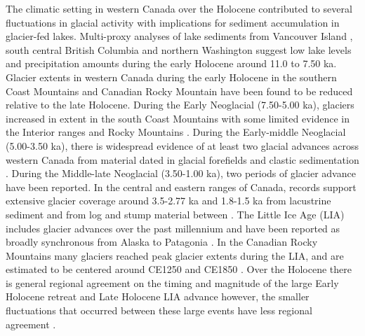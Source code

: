 \documentclass[Royal,times,doublespace,sageh]{sagej}
\begin{document}
The climatic setting in western Canada over the Holocene contributed to
several fluctuations in glacial activity with implications for sediment
accumulation in glacier-fed lakes. Multi-proxy analyses of lake
sediments from Vancouver Island \citep{Brown2006}, south central British
Columbia \citep{Lowe1997} and northern Washington \citep{Steinman2019}
suggest low lake levels and precipitation amounts during the early
Holocene around 11.0 to 7.50 ka. Glacier extents in western Canada
during the early Holocene in the southern Coast Mountains
\citep{Menounos2004, Koch2007a, Osborn2007} and Canadian Rocky Mountain
\citep{Luckman1988, Luckman1993} have been found to be reduced relative
to the late Holocene. During the Early Neoglacial (7.50-5.00 ka),
glaciers increased in extent in the south Coast Mountains
\citep{Osborn2007, Filippelli2006, Ryder1986} with some limited evidence
in the Interior ranges and Rocky Mountains \citep{Luckman1993}. During
the Early-middle Neoglacial (5.00-3.50 ka), there is widespread evidence
of at least two glacial advances across western Canada from material
dated in glacial forefields and clastic sedimentation
\citep{Koch2007a, Osborn2007, Menounos2008c, Gardner1985, Wood2004, Hodder2006b, Desloges1999, Leonard1999}.
During the Middle-late Neoglacial (3.50-1.00 ka), two periods of glacier
advance have been reported. In the central and eastern ranges of Canada,
records support extensive glacier coverage around 3.5-2.77 ka and
1.8-1.5 ka from lacustrine sediment
\citep{Leonard1999, Leonard1997, Dirszowsky1997a, Desloges1999} and from
log and stump material between
\citep{Wood2004, Luckman1995, Luckman1999}. The Little Ice Age (LIA)
includes glacier advances over the past millennium and have been
reported as broadly synchronous from Alaska to Patagonia
\citep{Luckman2000e}. In the Canadian Rocky Mountains many glaciers
reached peak glacier extents during the LIA, and are estimated to be
centered around CE1250 \citep{Luckman1995, Osborn2001, Leonard1997} and
CE1850 \citep{Luckman2000e, Leonard1997}. Over the Holocene there is
general regional agreement on the timing and magnitude of the large
Early Holocene retreat and Late Holocene LIA advance however, the
smaller fluctuations that occurred between these large events have less
regional agreement \citep{Menounos2009b}.
\end{document}
